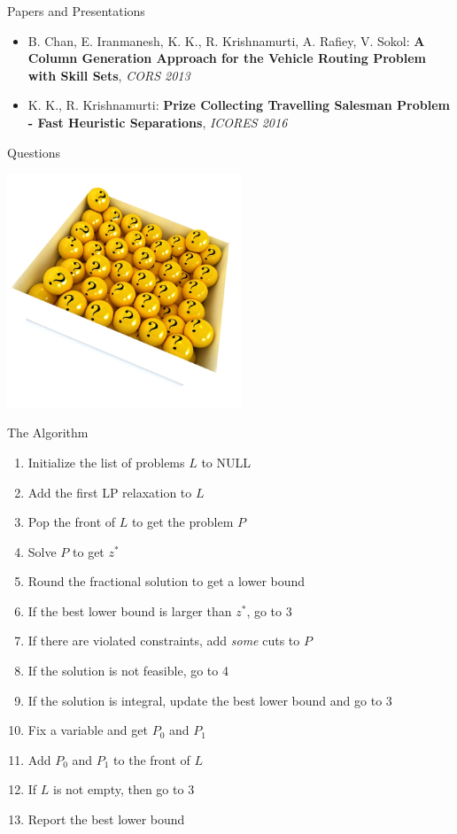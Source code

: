 \documentclass[10pt]{beamer}
\begin{document}
\begin{frame}[t]{Papers and Presentations}
    \begin{itemize}
        \item B. Chan, E. Iranmanesh, K. K., R. Krishnamurti, A. Rafiey, V. Sokol: \textbf{A Column Generation Approach for the Vehicle Routing Problem with Skill Sets}, \emph{CORS 2013}
        \item K. K., R. Krishnamurti: \textbf{Prize Collecting Travelling Salesman Problem - Fast Heuristic Separations}, \emph{ICORES 2016}
    \end{itemize}
\end{frame}


\begin{frame}{Questions}
    \begin{center}
        \includegraphics[width=7cm]{qmark.jpeg}
    \end{center}
\end{frame}

\begin{frame}[t]{The Algorithm}
    \begin{enumerate}
        \item<1-> Initialize the list of problems $L$ to \textsc{NULL}
        \item<2-> Add the first LP relaxation to $L$
        \item<3-> Pop the front of $L$ to get the problem $P$
        \item<4-> Solve $P$ to get $z^*$
        \item<5-> Round the fractional solution to get a lower bound
        \item<6-> If the best lower bound is larger than $z^*$, go to 3
        \item<7-> If there are violated constraints, add \emph{some} cuts to $P$
        \item<8-> If the solution is not feasible, go to 4
        \item<9-> If the solution is integral, update the best lower bound and go to 3
        \item<9-> Fix a variable and get $P_0$ and $P_1$
        \item<10-> Add $P_0$ and $P_1$ to the \alert{front} of $L$
        \item<11-> If $L$ is not empty, then go to 3
        \item<12-> Report the best lower bound
    \end{enumerate}
\end{frame}
\end{document}

